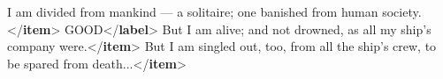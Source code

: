 \documentclass[11pt,twoside]{article}\makeatletter
\begin{document}
\begin{shaded}
\hspace*{6pt}\hspace*{6pt}I am divided from mankind — a solitaire; one\mbox{}\newline 
\hspace*{6pt}\hspace*{6pt}\hspace*{6pt}\hspace*{6pt}\hspace*{6pt}\hspace*{6pt} banished from human society.{</\textbf{item}>}\mbox{}\newline 
\hspace*{6pt}\mbox{}\newline 
{}\mbox{}\newline 
{}GOOD{</\textbf{label}>}\mbox{}\newline 
{}\mbox{}\newline 
\hspace*{6pt}\mbox{}\newline 
\hspace*{6pt}\hspace*{6pt}But I am alive; and not drowned, as all my\mbox{}\newline 
\hspace*{6pt}\hspace*{6pt}\hspace*{6pt}\hspace*{6pt}\hspace*{6pt}\hspace*{6pt} ship's company were.{</\textbf{item}>}\mbox{}\newline 
\hspace*{6pt}\hspace*{6pt}But I am singled out, too, from all the ship's\mbox{}\newline 
\hspace*{6pt}\hspace*{6pt}\hspace*{6pt}\hspace*{6pt}\hspace*{6pt}\hspace*{6pt} crew, to be spared from death...{</\textbf{item}>}\mbox{}\newline 

\end{shaded}
\end{document}
